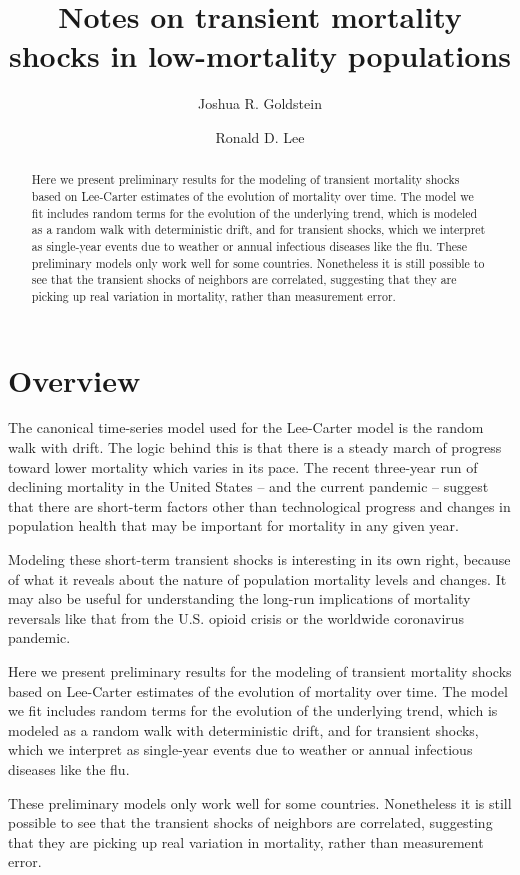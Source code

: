 \documentclass[12pt]{article}
\title{Notes on transient mortality shocks in low-mortality populations}
\author{Joshua R. Goldstein \and Ronald D. Lee}
\begin{document}
\maketitle
\begin{abstract}
  Here we present preliminary results for the modeling of transient mortality shocks
  based on Lee-Carter estimates of the evolution of mortality over
  time. The model we fit includes random terms for the evolution of
  the underlying trend, which is modeled as a random walk with
  deterministic drift, and for transient shocks, which we interpret
  as single-year events due to weather or annual infectious diseases
  like the flu. These preliminary models only work well for some
  countries. Nonetheless it is still possible to see that the
  transient shocks of neighbors are correlated, suggesting that they
  are picking up real variation in mortality, rather than measurement
  error.
\end{abstract}

\section{Overview}


The canonical time-series model used for the Lee-Carter model is the
random walk with drift. The logic behind this is that there is a
steady march of progress toward lower mortality which varies in its
pace. The recent three-year run of declining mortality in the United
States -- and the current pandemic -- suggest that there are
short-term factors other than technological progress and changes in
population health that may be important for mortality in any given
year.

Modeling these short-term transient shocks is interesting in its own
right, because of what it reveals about the nature of population
mortality levels and changes.  It may also be useful for understanding
the long-run implications of mortality reversals like that from the
U.S. opioid crisis or the worldwide coronavirus pandemic.


Here we present preliminary results for the modeling of transient
mortality shocks based on Lee-Carter estimates of the evolution of
mortality over time. The model we fit includes random terms for the
evolution of the underlying trend, which is modeled as a random walk
with deterministic drift, and for transient shocks, which we interpret
as single-year events due to weather or annual infectious diseases
like the flu.

These preliminary models only work well for some
countries. Nonetheless it is still possible to see that the transient
shocks of neighbors are correlated, suggesting that they are picking
up real variation in mortality, rather than measurement error.
\end{document}
